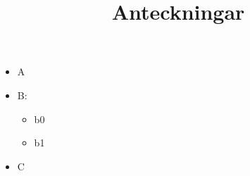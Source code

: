 \documentclass[swedish,apacite,notes,nomargin]{rootmos}
\title{Anteckningar}
\begin{document}
\begin{itemize}
    \item A
    \item B:
        \begin{itemize}
            \item b0
            \item b1
        \end{itemize}
    \item C
\end{itemize}
\end{document}
